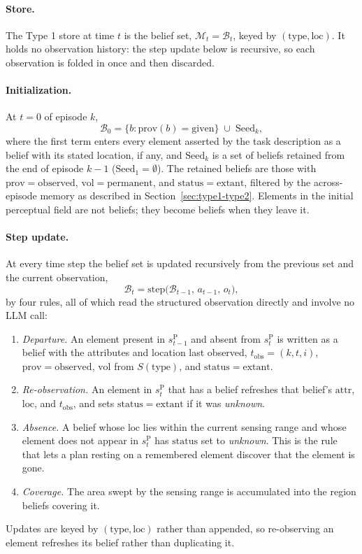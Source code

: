 \documentclass[11pt]{article}
\newcommand{\calM}{\mathcal{M}}
\newcommand{\calB}{\mathcal{B}}
\newcommand{\sP}{s^{\mathrm{P}}}
\newcommand{\loc}{\mathrm{loc}}
\newcommand{\prov}{\mathrm{prov}}
\newcommand{\vol}{\mathrm{vol}}
\newcommand{\stat}{\mathrm{status}}
\newcommand{\attr}{\mathrm{attr}}
\newcommand{\type}{\mathrm{type}}
\newcommand{\tobs}{t_{\mathrm{obs}}}
\begin{document}
\paragraph{Store.}
The Type 1 store at time $t$ is the belief set, $\calM_t=\calB_t$, keyed by $(\type,\loc)$. It holds no observation history: the step update below is recursive, so each observation is folded in once and then discarded. 

\paragraph{Initialization.}
At $t=0$ of episode $k$,
\begin{equation}
\calB_0=\{b:\prov(b)=\mathrm{given}\}\;\cup\;\mathrm{Seed}_k,
\label{eq:init}
\end{equation}
where the first term enters every element asserted by the task description as a belief with its stated location, if any, and $\mathrm{Seed}_k$ is a set of beliefs retained from the end of episode $k-1$ ($\mathrm{Seed}_1=\emptyset$). The retained beliefs are those with $\prov=\mathrm{observed}$, $\vol=\mathrm{permanent}$, and $\stat=\mathrm{extant}$, filtered by the across-episode memory as described in Section~\ref{sec:type1-type2}. Elements in the initial perceptual field are not beliefs; they become beliefs when they leave it.

\paragraph{Step update.}
At every time step the belief set is updated recursively from the previous set and the current observation,
\begin{equation}
\calB_t=\mathrm{step}\big(\calB_{t-1},\,a_{t-1},\,o_t\big),
\label{eq:step}
\end{equation}
by four rules, all of which read the structured observation directly and involve no LLM call:
\begin{enumerate}[leftmargin=1.5em,itemsep=1pt]
\item \emph{Departure.} An element present in $\sP_{t-1}$ and absent from $\sP_t$ is written as a belief with the attributes and location last observed, $\tobs=(k,t,i)$, $\prov=\mathrm{observed}$, $\vol$ from $S(\type)$, and $\stat=\mathrm{extant}$.
\item \emph{Re-observation.} An element in $\sP_t$ that has a belief refreshes that belief's $\attr$, $\loc$, and $\tobs$, and sets $\stat=\mathrm{extant}$ if it was \emph{unknown}.
\item \emph{Absence.} A belief whose $\loc$ lies within the current sensing range and whose element does not appear in $\sP_t$ has $\stat$ set to \emph{unknown}. This is the rule that lets a plan resting on a remembered element discover that the element is gone.
\item \emph{Coverage.} The area swept by the sensing range is accumulated into the region beliefs covering it.
\end{enumerate}
Updates are keyed by $(\type,\loc)$ rather than appended, so re-observing an element refreshes its belief rather than duplicating it. 
\end{document}
